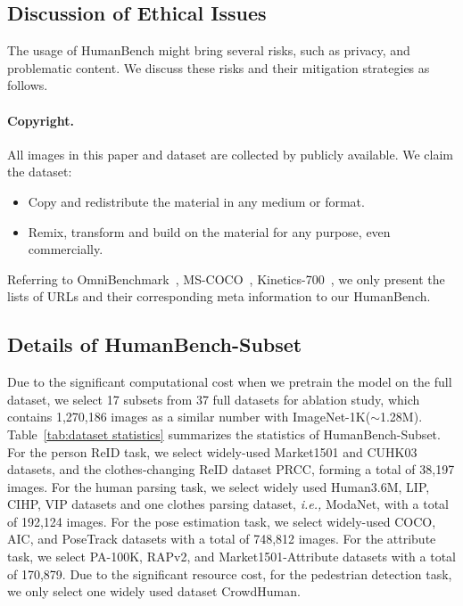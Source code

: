 \documentclass[10pt,twocolumn,letterpaper]{article}
\begin{document}
\subsection{Discussion of Ethical Issues}
The usage of HumanBench might bring several risks, such as privacy, and problematic content. We discuss these risks and their mitigation strategies as follows. 

\paragraph{Copyright.} All images in this paper and dataset are collected by publicly available. We claim the dataset:
\begin{itemize}
    \item Copy and redistribute the material in any medium or format.
    \item Remix, transform and build on the material for any purpose, even commercially.
\end{itemize}
Referring to OmniBenchmark~\cite{zhang2022benchmarking}, MS-COCO~\cite{lin2014microsoft}, Kinetics-700~\cite{carreira2019short}, we only present the lists of URLs and their corresponding meta information to our HumanBench. 

\subsection{Details of HumanBench-Subset}
Due to the significant computational cost when we pretrain the model on the full dataset, we select 17 subsets from 37 full datasets for ablation study, which contains 1,270,186 images as a similar number with ImageNet-1K($\sim$1.28M). Table~\ref{tab:dataset statistics} summarizes the statistics of HumanBench-Subset. For the person ReID task, we select widely-used Market1501 and CUHK03 datasets, and the clothes-changing ReID dataset PRCC, forming a total of 38,197 images. For the human parsing task, we select widely used Human3.6M, LIP, CIHP, VIP datasets and one clothes parsing dataset, \emph{i.e.,} ModaNet, with a total of 192,124 images. For the pose estimation task, we select widely-used COCO, AIC, and PoseTrack datasets with a total of 748,812 images. For the attribute task, we select PA-100K, RAPv2, and Market1501-Attribute datasets with a total of 170,879. Due to the significant resource cost, for the pedestrian detection task, we only select one widely used dataset CrowdHuman.
\end{document}
